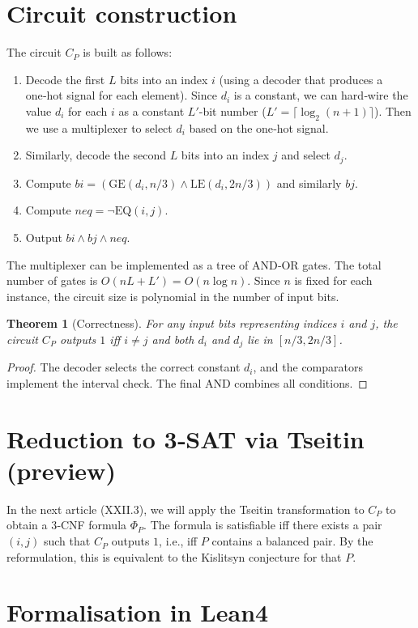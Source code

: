 \documentclass[11pt,a4paper]{article}
\newtheorem{theorem}{Theorem}[section]
\begin{document}
\section{Circuit construction}

The circuit $C_P$ is built as follows:
\begin{enumerate}
\item Decode the first $L$ bits into an index $i$ (using a decoder that produces a one‑hot signal for each element). Since $d_i$ is a constant, we can hard‑wire the value $d_i$ for each $i$ as a constant $L'$-bit number ($L' = \lceil \log_2(n+1)\rceil$). Then we use a multiplexer to select $d_i$ based on the one‑hot signal.
\item Similarly, decode the second $L$ bits into an index $j$ and select $d_j$.
\item Compute $bi = (\mathrm{GE}(d_i, n/3) \land \mathrm{LE}(d_i, 2n/3))$ and similarly $bj$.
\item Compute $neq = \neg \mathrm{EQ}(i,j)$.
\item Output $bi \land bj \land neq$.
\end{enumerate}
The multiplexer can be implemented as a tree of AND‑OR gates. The total number of gates is $O(n L + L') = O(n \log n)$. Since $n$ is fixed for each instance, the circuit size is polynomial in the number of input bits.

\begin{theorem}[Correctness]
For any input bits representing indices $i$ and $j$, the circuit $C_P$ outputs $1$ iff $i \neq j$ and both $d_i$ and $d_j$ lie in $[n/3, 2n/3]$.
\end{theorem}
\begin{proof}
The decoder selects the correct constant $d_i$, and the comparators implement the interval check. The final AND combines all conditions.
\end{proof}

\section{Reduction to 3‑SAT via Tseitin (preview)}

In the next article (XXII.3), we will apply the Tseitin transformation to $C_P$ to obtain a 3‑CNF formula $\Phi_P$. The formula is satisfiable iff there exists a pair $(i,j)$ such that $C_P$ outputs $1$, i.e., iff $P$ contains a balanced pair. By the reformulation, this is equivalent to the Kislitsyn conjecture for that $P$.

\section{Formalisation in Lean4}
\end{document}
